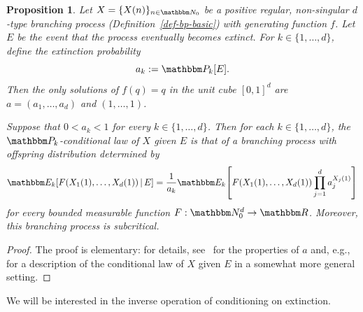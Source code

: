 \documentclass[11pt]{article}
\theoremstyle{plain}
\newtheorem{prop}[thm]{Proposition}
\theoremstyle{definition}
\numberwithin{equation}{section}
\newcommand{\eqb}{\begin{equation}}
\newcommand{\eqe}{\end{equation}}
\newcommand{\eqbn}{\begin{equation*}}
\newcommand{\eqen}{\end{equation*}}
\newcommand{\BB}{\mathbbm}
\let\originalleft\left
\let\originalright\right
\renewcommand{\left}{\mathopen{}\mathclose\bgroup\originalleft}
\renewcommand{\right}{\aftergroup\egroup\originalright}
\begin{document}
\begin{prop} \label{prop-cond-on-ext}
Let $X = \{X(n) \}_{n\in\BB N_0}$ be a positive regular, non-singular $d$-type branching process  (Definition~\ref{def-bp-basic}) with generating function $f$. Let $E$ be the event that the process eventually becomes extinct. For $k\in \{1,\dots,d\}$, define the extinction probability 
\eqbn
a_k := \BB P_k\left[ E \right] .
\eqen 
Then the only solutions of $f(q) =q$ in the unit cube $[0,1]^d$ are $a = (a_1,\dots,a_d)$ and $(1,\dots,1)$. 

Suppose that $0 < a_k < 1$ for every $k \in \{1,\dots,d\}$. Then for each $k\in\{1,\dots,d\}$, the $\BB P_k$-conditional law of $X$ given $E$ is that of a branching process with offspring distribution determined by 
\eqb \label{eqn-cond-on-ext}
\BB E_k\left[ F(X_1(1) , \dots, X_d(1)) \,|\, E \right] 
 = \frac{1}{a_k} \BB E_k\left[ F(X_1(1),\dots,X_d(1)) \prod_{j=1}^d a_j^{X_j(1)} \right]   
\eqe 
for every bounded measurable function $F : \BB N_0^d \to \BB R$. Moreover, this branching process is subcritical. 
\end{prop}
\begin{proof}
The proof is elementary: for details, see~\cite[Theorem 2, Section V.3]{an-branching-processes} for the properties of $a$ and, e.g.,~\cite[Theorem 1]{jl-cond-on-ext} for a description of the conditional law of $X$ given $E$ in a somewhat more general setting. 
\end{proof}

We will be interested in the inverse operation of conditioning on extinction. 
\end{document}
